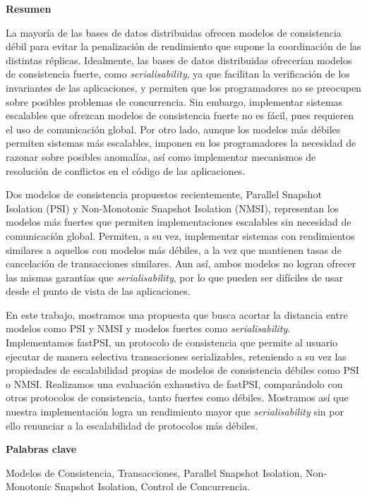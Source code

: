 \newpage

\begin{center}
{\bf \Huge Resumen}
\end{center}

\vspace{1cm}

La mayoría de las bases de datos distribuidas ofrecen modelos de consistencia
débil para evitar la penalización de rendimiento que supone la coordinación de
las distintas réplicas. Idealmente, las bases de datos distribuidas ofrecerían
modelos de consistencia fuerte, como \emph{serialisability}, ya que facilitan la
verificación de los invariantes de las aplicaciones, y permiten que los
programadores no se preocupen sobre posibles problemas de concurrencia. Sin
embargo, implementar sistemas escalables que ofrezcan modelos de consistencia
fuerte no es fácil, pues requieren el uso de comunicación global. Por otro lado,
aunque los modelos más débiles permiten sistemas más escalables, imponen en los
programadores la necesidad de razonar sobre posibles anomalías, así como
implementar mecanismos de resolución de conflictos en el código de las aplicaciones.

Dos modelos de consistencia propuestos recientemente, Parallel Snapshot Isolation
(PSI) y Non-Monotonic Snapshot Isolation (NMSI), representan los modelos más
fuertes que permiten implementaciones escalables sin necesidad de comunicación
global. Permiten, a su vez, implementar sistemas con rendimientos similares a
aquellos con modelos más débiles, a la vez que mantienen tasas de cancelación de
transacciones similares. Aun así, ambos modelos no logran ofrecer las mismas
garantías que \emph{serialisability}, por lo que pueden ser difíciles de usar desde el
punto de vista de las aplicaciones.

En este trabajo, mostramos una propuesta que busca acortar la distancia entre
modelos como PSI y NMSI y modelos fuertes como \emph{serialisability}. Implementamos
fastPSI, un protocolo de consistencia que permite al usuario ejecutar de manera
selectiva transacciones serializables, reteniendo a su vez las propiedades de
escalabilidad propias de modelos de consistencia débiles como PSI o NMSI.
Realizamos una evaluación exhaustiva de fastPSI, comparándolo con otros protocolos
de consistencia, tanto fuertes como débiles. Mostramos así que nuestra
implementación logra un rendimiento mayor que \emph{serialisability} sin por ello
renunciar a la escalabilidad de protocolos más débiles.

\vspace{1cm}

\begin{center}
{\bf \Large Palabras clave}
\end{center}

\vspace{0.5cm}

Modelos de Consistencia, Transacciones, Parallel Snapshot Isolation,
Non-Monotonic Snapshot Isolation, Control de Concurrencia.
